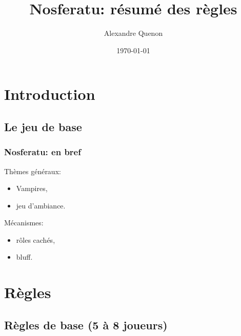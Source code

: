 \documentclass[11pt]{beamer}
\title{Nosferatu: résumé des règles}
\author[A. Quenon]{Alexandre Quenon}
\date{\today}
\begin{document}
\frame{\titlepage}


\begin{frame}
	\tableofcontents
\end{frame}

\AtBeginSection{%
	\begin{frame}
		\tableofcontents[currentsection]
	\end{frame}
}


\section{Introduction}

	\subsection{Le jeu de base}

\begin{frame}
	\frametitle{Nosferatu: en bref}
	
	Thèmes généraux:
	\begin{itemize}
		\item Vampires,
		\item jeu d'ambiance.
	\end{itemize}

	\vspace*{1ex}
	
	Mécanismes:
	\begin{itemize}
		\item rôles cachés,
		\item bluff.
	\end{itemize}
\end{frame}




\section{Règles}

	\subsection{Règles de base (5 à 8 joueurs)}
\end{document}
